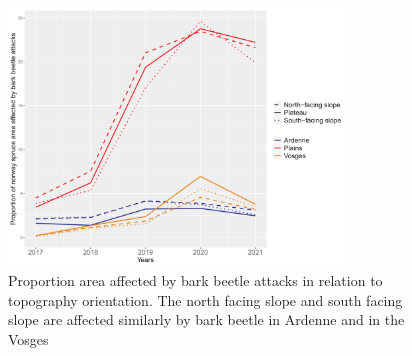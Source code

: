 \documentclass[3p,procedia]{elsarticle}
\begin{document}
\begin{figure}
\centering
	\includegraphics[width=0.8\textwidth]{SS_ardenne_vosges_plaines.png}
    \caption{Proportion area affected by bark beetle attacks in relation to topography orientation. The north facing slope and south facing slope are affected similarly by bark beetle in Ardenne and in the Vosges}
	\label{ss_sco}
\end{figure}

	
\end{document}
